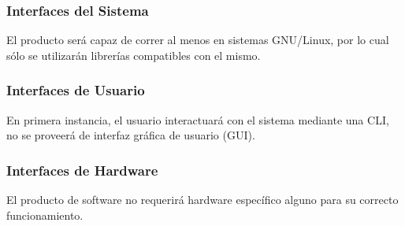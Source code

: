\documentclass[12pt,a4paper,spanish]{article}
\begin{document}
	\subsubsection{Interfaces del Sistema}
		El producto será capaz de correr al menos en sistemas GNU/Linux, por lo cual sólo se utilizarán librerías compatibles con el mismo.

	\subsubsection{Interfaces de Usuario}		
		En primera instancia, el usuario interactuará con el sistema mediante una CLI, no se proveerá de interfaz gráfica de usuario (GUI).

	\subsubsection{Interfaces de Hardware}
		El producto de software no requerirá hardware específico alguno para su correcto funcionamiento.
\end{document}
